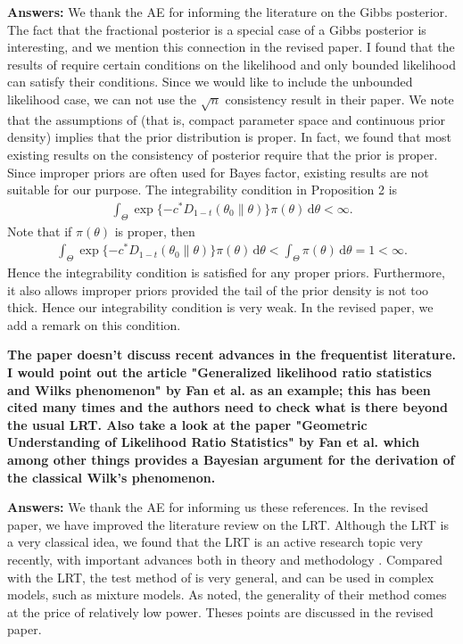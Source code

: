 \documentclass[11pt]{article}
\theoremstyle{plain}
\theoremstyle{definition}
\theoremstyle{remark}
\begin{document}
\textbf{Answers:}
We thank the AE for informing the literature on the Gibbs posterior.
The fact that the fractional posterior is a special case of a Gibbs posterior is interesting, and we mention this connection in the revised paper.
I found that the results of \cite{Chernozhukov2003} require certain conditions on the likelihood and only bounded likelihood can satisfy their conditions.
Since we would like to include the unbounded likelihood case, we can not use the $\sqrt{n}$ consistency result in their paper.
We note that the assumptions of \cite{Chernozhukov2003} (that is, compact parameter space and continuous prior density) implies that the prior distribution is proper.
In fact, we found that most existing results on the consistency of posterior require that the prior is proper.
Since improper priors are often used for Bayes factor, existing results are not suitable for our purpose.
The integrability condition in Proposition 2 is
\begin{align*}
    \int_{\Theta} \exp\{ - c^* D_{1-t}(\theta_0 \| \theta )\} \pi(\theta) \, \mathrm d \theta < \infty.
\end{align*}
Note that if $\pi(\theta)$ is proper, then
\begin{align*}
    \int_{\Theta} \exp\{ - c^* D_{1-t}(\theta_0 \| \theta )\} \pi(\theta) \, \mathrm d \theta <
    \int_{\Theta} \pi(\theta) \, \mathrm d \theta = 1 < \infty.
\end{align*}
Hence the integrability condition is satisfied for any proper priors.
Furthermore, it also allows improper priors provided the tail of the prior density is not too thick.
Hence our integrability condition is very weak.
In the revised paper, we add a remark on this condition.


\textbf{
    The paper doesn't discuss recent advances in the frequentist literature. I would point out the article "Generalized likelihood ratio statistics and Wilks phenomenon" by Fan et al. as an example; this has been cited many times and the authors need to check what is there beyond the usual LRT. Also take a look at the paper "Geometric Understanding of Likelihood Ratio Statistics" by Fan et al. which among other things provides a Bayesian argument for the derivation of the classical Wilk's phenomenon.
}

\textbf{Answers:}
We thank the AE for informing us these references.
In the revised paper, we have improved the literature review on the LRT.
Although the LRT is a very classical idea, we found that the LRT is an active research topic very recently, with important advances both in theory \cite{Sur2019The,Anastasiou2020Bounds} and methodology \cite{Wasserman2020}.
Compared with the LRT, the test method of \cite{Wasserman2020} is very general, and can be used in complex models, such as mixture models.
As \cite{Wasserman2020} noted, the generality of their method comes at the price of relatively low power.
Theses points are discussed in the revised paper.
\end{document}
